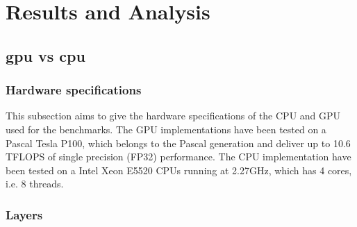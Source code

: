 \documentclass[11pt]{report}
\begin{document}
\chapter{Results and Analysis} \label{result_and_analysis}

\section{\acrshort{gpu} vs \acrshort{cpu}}

\subsection{Hardware specifications}

This subsection aims to give the hardware specifications of the CPU and GPU used for the benchmarks. The GPU implementations have been tested on a Pascal Tesla P100, which belongs to the Pascal generation and deliver up to 10.6 TFLOPS of single precision (FP32) performance. The CPU implementation have been tested on a Intel Xeon E5520 CPUs running at 2.27GHz, which has 4 cores, i.e. 8 threads.

\subsection{Layers}
\end{document}
